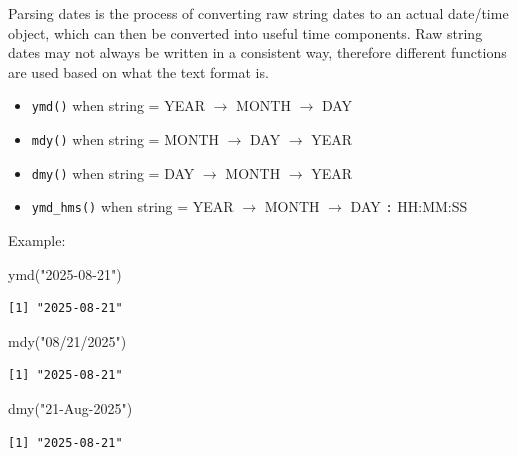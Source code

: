 \documentclass[
  letterpaper,
  DIV=11,
  numbers=noendperiod]{scrreprt}
\newenvironment{Shaded}{\begin{snugshade}}{\end{snugshade}}
\newcommand{\FunctionTok}[1]{\textcolor[rgb]{0.28,0.35,0.67}{#1}}
\newcommand{\NormalTok}[1]{\textcolor[rgb]{0.00,0.23,0.31}{#1}}
\newcommand{\StringTok}[1]{\textcolor[rgb]{0.13,0.47,0.30}{#1}}
\providecommand{\tightlist}{%
  \setlength{\itemsep}{0pt}\setlength{\parskip}{0pt}}
\begin{document}
Parsing dates is the process of converting raw string dates to an actual
date/time object, which can then be converted into useful time
components. Raw string dates may not always be written in a consistent
way, therefore different functions are used based on what the text
format is.

\begin{itemize}
\tightlist
\item
  \texttt{ymd()} when string = YEAR \(\rightarrow\) MONTH
  \(\rightarrow\) DAY
\item
  \texttt{mdy()} when string = MONTH \(\rightarrow\) DAY \(\rightarrow\)
  YEAR
\item
  \texttt{dmy()} when string = DAY \(\rightarrow\) MONTH \(\rightarrow\)
  YEAR
\item
  \texttt{ymd\_hms()} when string = YEAR \(\rightarrow\) MONTH
  \(\rightarrow\) DAY \texttt{:} HH:MM:SS
\end{itemize}

Example:

\begin{Shaded}
\begin{Highlighting}[]
\FunctionTok{ymd}\NormalTok{(}\StringTok{"2025{-}08{-}21"}\NormalTok{)}
\end{Highlighting}
\end{Shaded}

\begin{verbatim}
[1] "2025-08-21"
\end{verbatim}

\begin{Shaded}
\begin{Highlighting}[]
\FunctionTok{mdy}\NormalTok{(}\StringTok{"08/21/2025"}\NormalTok{)}
\end{Highlighting}
\end{Shaded}

\begin{verbatim}
[1] "2025-08-21"
\end{verbatim}

\begin{Shaded}
\begin{Highlighting}[]
\FunctionTok{dmy}\NormalTok{(}\StringTok{"21{-}Aug{-}2025"}\NormalTok{)}
\end{Highlighting}
\end{Shaded}

\begin{verbatim}
[1] "2025-08-21"
\end{verbatim}
\end{document}
